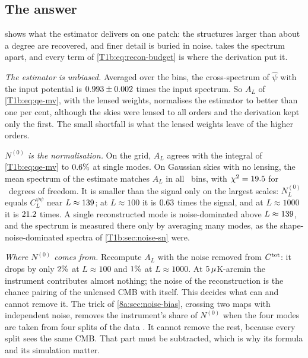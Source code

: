 \subsection{The answer}
\label{T1b:sec:recon-answer}

 shows what the estimator delivers on one patch: the structures larger than about a degree are recovered, and finer detail is buried in noise.  takes the spectrum apart, and every term of \eqref{T1b:eq:recon-budget} is where the derivation put it.

\emph{The estimator is unbiased.} Averaged over the bins, the cross-spectrum of $\hat\psi$ with the input potential is $0.993\pm0.002$ times the input spectrum. So $A_L$ of \eqref{T1b:eq:qe-mv}, with the lensed weights, normalises the estimator to better than one per cent, although the skies were lensed to all orders and the derivation kept only the first. The small shortfall is what the lensed weights leave of the higher orders.

\emph{$N^{(0)}$ is the normalisation.} On the grid, $A_L$ agrees with the integral of \eqref{T1b:eq:qe-mv} to $0.6\%$ at single modes. On Gaussian skies with no lensing, the mean spectrum of the estimate matches $A_L$ in all \TOneRNbin\ bins, with $\chi^2=19.5$ for \TOneRNbin\ degrees of freedom. It is smaller than the signal only on the largest scales: $N^{(0)}_L$ equals $C^{\psi\psi}_L$ near $L\approx139$; at $L\approx100$ it is $0.63$ times the signal, and at $L\approx1000$ it is $21.2$ times. A single reconstructed mode is noise-dominated above $L\approx139$, and the spectrum is measured there only by averaging many modes, as the shape-noise-dominated spectra of \cref{T1b:sec:noise-sn} were.

\emph{Where $N^{(0)}$ comes from.} Recompute $A_L$ with the noise removed from $C^{\rm tot}$: it drops by only $2\%$ at $L\approx100$ and $1\%$ at $L\approx1000$. At $5\,\mu$K-arcmin the instrument contributes almost nothing; the noise of the reconstruction is the chance pairing of the unlensed CMB with itself. This decides what can and cannot remove it. The trick of \cref{8a:sec:noise-bias}, crossing two maps with independent noise, removes the instrument's share of $N^{(0)}$ when the four modes are taken from four splits of the data \cite{Madhavacheril2021}. It cannot remove the rest, because every split sees the same CMB. That part must be subtracted, which is why its formula and its simulation matter.

